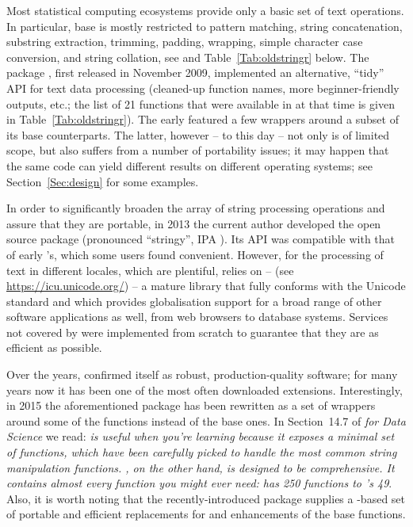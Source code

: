 \documentclass[nojss]{jss}\usepackage[]{graphicx}\usepackage[]{xcolor}
\begin{document}
\bigskip
Most statistical computing ecosystems provide only a basic set of text
operations. In particular, base  \citep{Rproject:home}
is mostly restricted to pattern matching, string concatenation,
substring extraction, trimming, padding, wrapping,
simple character case conversion, and string collation,
see \citep[Chapter~8]{Chambers2008:SoftDA} and Table~\ref{Tab:oldstringr} below.
The  package \citep{Wickham2010:stringr},
first released in November 2009, implemented an alternative, ``tidy''
API for text data processing (cleaned-up function names,
more beginner-friendly outputs, etc.;
the list of 21 functions that were available in  at that
time is given in Table~\ref{Tab:oldstringr}).
The early  featured a few wrappers around
a subset of its base  counterparts. The latter,
however -- to this day -- not only is of limited scope,
but also suffers from a number of portability issues; it may happen that
the same code can yield different results on different operating systems;
see Section~\ref{Sec:design} for some examples.



In order to significantly broaden the array of string processing
operations and assure that they are portable, in 2013 the current
author developed the open source  package
(pronounced ``stringy'', IPA \textipa{[{stringi}]}).
Its API was compatible with that of early 's,
which some users found convenient. However, for the processing of text
in different locales, which are plentiful,  relies
on  -- 
(see \url{https://icu.unicode.org/}) -- a mature library that
fully conforms with the Unicode standard and which provides globalisation
support for a broad range of other software applications as well, from
web browsers to database systems. Services not covered by 
were implemented from scratch to guarantee that they are as efficient
as possible.

Over the years,  confirmed itself as robust,
production-quality software; for many years now it has been one of the
most often downloaded  extensions. Interestingly, in 2015 the
aforementioned  package has been rewritten as a
set of wrappers around some of the  functions instead of
the base  ones.
In Section~14.7 of \textit{ for Data Science}
\citep{GrolemundWickham2017:rdatascience}
we read: \textit{ is useful when you're learning because
it exposes a minimal set of functions, which have been carefully picked
to handle the most common string manipulation functions. ,
on the other hand, is designed to be comprehensive. It contains almost
every function you might ever need:  has 250 functions to
's 49}.
Also, it is worth noting that the recently-introduced 
package \citep{stringx} supplies a -based set of portable
and efficient replacements for and enhancements of the base 
functions.
\end{document}
